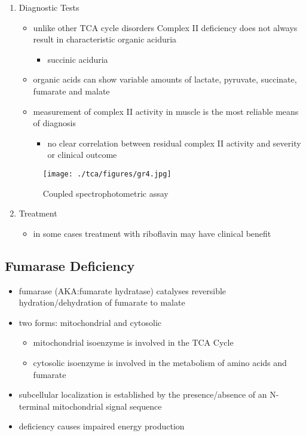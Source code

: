 \documentclass{scrartcl}
\begin{document}
\begin{enumerate}
\item Diagnostic Tests
\label{sec:orge10330f}
\begin{itemize}
\item unlike other TCA cycle disorders Complex II deficiency does not always
result in characteristic organic aciduria
\begin{itemize}
\item succinic aciduria
\end{itemize}
\item organic acids can show variable amounts of lactate, pyruvate, succinate, fumarate and malate
\item measurement of complex II activity in muscle is the most reliable
means of diagnosis
\begin{itemize}
\item no clear correlation between residual complex II activity and
severity or clinical outcome
\end{itemize}
\end{itemize}

\begin{figure}[htbp]
\centering
\texttt{[image: ./tca/figures/gr4.jpg]}
\caption{\label{fig:org6b3fbbc}
Coupled spectrophotometric assay}
\end{figure}

\item Treatment
\label{sec:orgdbfbfb8}
\begin{itemize}
\item in some cases treatment with riboflavin may have clinical benefit
\end{itemize}
\end{enumerate}


\subsection{Fumarase Deficiency}
\label{sec:orgbd9bd20}
\begin{itemize}
\item fumarase (AKA:fumarate hydratase) catalyses reversible
hydration/dehydration of fumarate to malate
\end{itemize}
\begin{itemize}
\item two forms: mitochondrial and cytosolic
\begin{itemize}
\item mitochondrial isoenzyme is involved in the TCA Cycle
\item cytosolic isoenzyme is involved in the metabolism of amino acids and fumarate
\end{itemize}
\item subcellular localization is established by the presence/absence of an N-terminal mitochondrial signal
sequence
\item deficiency causes impaired energy production
\end{itemize}
\end{document}
